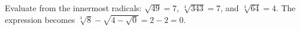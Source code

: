 Evaluate from the innermost radicals: $\sqrt{49}=7$, $\sqrt[3]{343}=7$, and $\sqrt[3]{64}=4$. The expression becomes $\sqrt[3]8-\sqrt{4-\sqrt0}=2-2=\boxed0$.

